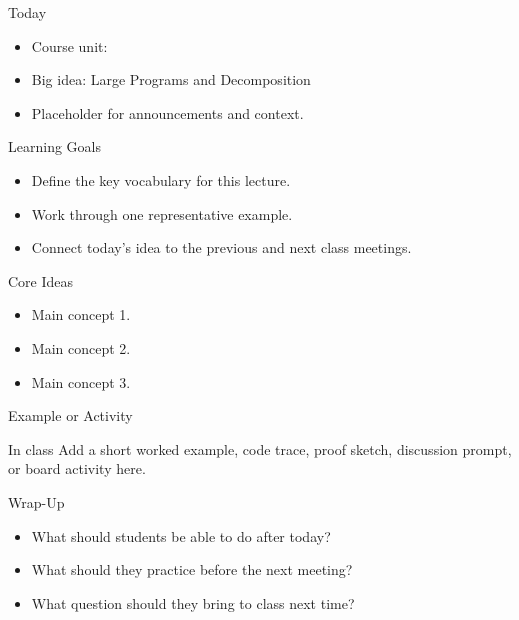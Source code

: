 \documentclass[aspectratio=169]{beamer}
\begin{document}
\makedecktitle

\begin{frame}{Today}
  \begin{itemize}
    \item Course unit: \CourseUnit
    \item Big idea: Large Programs and Decomposition
    \item Placeholder for announcements and context.
  \end{itemize}
\end{frame}

\begin{frame}{Learning Goals}
  \begin{itemize}
    \item Define the key vocabulary for this lecture.
    \item Work through one representative example.
    \item Connect today's idea to the previous and next class meetings.
  \end{itemize}
\end{frame}

\begin{frame}{Core Ideas}
  \placeholdernote
  \begin{itemize}
    \item Main concept 1.
    \item Main concept 2.
    \item Main concept 3.
  \end{itemize}
\end{frame}

\begin{frame}{Example or Activity}
  \begin{block}{In class}
    Add a short worked example, code trace, proof sketch, discussion prompt, or board activity here.
  \end{block}
\end{frame}

\begin{frame}{Wrap-Up}
  \begin{itemize}
    \item What should students be able to do after today?
    \item What should they practice before the next meeting?
    \item What question should they bring to class next time?
  \end{itemize}
\end{frame}
\end{document}
